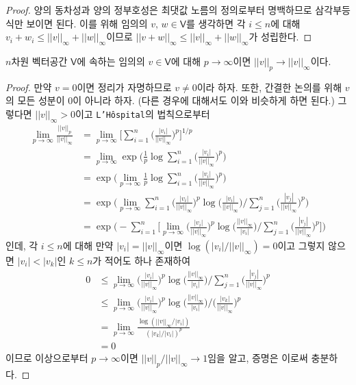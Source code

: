 \begin{proof}
    양의 동차성과 양의 정부호성은 최댓값 노름의 정의로부터 명백하므로 삼각부등식만 보이면 된다. 이를 위해 임의의 $v,\,w\in\mathsf{V}$를 생각하면 각 $i\leq n$에 대해 $v_i+w_i\leq||v||_\infty+||w||_\infty$이므로 $||v+w||_\infty\leq||v||_\infty+||w||_\infty$가 성립한다.
\end{proof}

\begin{theorem}
    $n$차원 벡터공간 $\mathsf{V}$에 속하는 임의의 $v\in\mathsf{V}$에 대해 $p\to\infty$이면 $||v||_p\to||v||_\infty$이다.
\end{theorem}

\begin{proof}
    만약 $v=0$이면 정리가 자명하므로 $v\ne0$이라 하자. 또한, 간결한 논의를 위해 $v$의 모든 성분이 $0$이 아니라 하자. (다른 경우에 대해서도 이와 비슷하게 하면 된다.) 그렇다면 $||v||_\infty>0$이고 \texttt{L'H\^ospital}의 법칙으로부터
    \begin{align*}
        \lim_{p\to\infty}\frac{||v||_p}{||v||_\infty}&=\lim_{p\to\infty}\bigg[\sum_{i=1}^n\bigg(\frac{|v_i|}{||v||_\infty}\bigg)^p\bigg]^{1/p}\\
        &=\lim_{p\to\infty}\exp\bigg(\frac{1}{p}\log\sum_{i=1}^n\bigg(\frac{|v_i|}{||v||_\infty}\bigg)^p\bigg)\\
        &=\exp\bigg(\lim_{p\to\infty}\frac{1}{p}\log\sum_{i=1}^n\bigg(\frac{|v_i|}{||v||_\infty}\bigg)^p\bigg)\\
        &=\exp\bigg(\lim_{p\to\infty}\sum_{i=1}^n\bigg(\frac{|v_i|}{||v||_\infty}\bigg)^p\log\bigg(\frac{|v_i|}{||v||_\infty}\bigg)\bigg/\sum_{j=1}^n\bigg(\frac{|v_j|}{||v||_\infty}\bigg)^p\bigg)\\
        &=\exp\bigg(-\sum_{i=1}^n\bigg[\lim_{p\to\infty}\bigg(\frac{|v_i|}{||v||_\infty}\bigg)^p\log\bigg(\frac{||v||_\infty}{|v_i|}\bigg)\bigg/\sum_{j=1}^n\bigg(\frac{|v_j|}{||v||_\infty}\bigg)^p\bigg]\bigg)
    \end{align*}
    인데, 각 $i\leq n$에 대해 만약 $|v_i|=||v||_\infty$이면 $\log(|v_i|/||v||_\infty)=0$이고 그렇지 않으면 $|v_i|<|v_k|$인 $k\leq n$가 적어도 하나 존재하여
    \begin{align*}
        0&\leq\lim_{p\to\infty}\bigg(\frac{|v_i|}{||v||_\infty}\bigg)^p\log\bigg(\frac{||v||_\infty}{|v_i|}\bigg)\bigg/\sum_{j=1}^n\bigg(\frac{|v_j|}{||v||_\infty}\bigg)^p\\
        &\leq\lim_{p\to\infty}\bigg(\frac{|v_i|}{||v||_\infty}\bigg)^p\log\bigg(\frac{||v||_\infty}{|v_i|}\bigg)\bigg/\bigg(\frac{|v_k|}{||v||_\infty}\bigg)^p\\
        &=\lim_{p\to\infty}\frac{\log(||v||_\infty/|v_i|)}{(|v_k|/|v_i|)^p}\\
        &=0
    \end{align*}
    이므로 이상으로부터 $p\to\infty$이면 $||v||_p/||v||_\infty\to1$임을 알고, 증명은 이로써 충분하다.
\end{proof}

